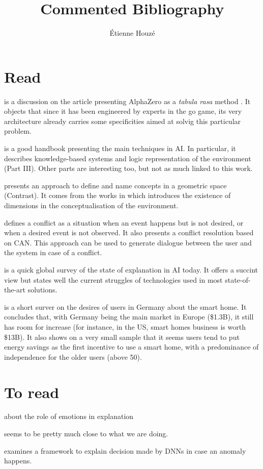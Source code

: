 \documentclass{article}
\title{Commented Bibliography}
\author{\'Etienne Houzé}
\date{}
\begin{document}
\maketitle
    \section{Read}

    \cite{marcus2018innateness} is a discussion on the article presenting AlphaZero as a \emph{tabula rasa} method \cite{silver2017mastering}. It objects that since it has been engineered by experts in the go game, its very architecture already carries some specificities aimed at solvig this particular problem.

    \cite{russell2016artificial} is a good handbook presenting the main techniques in AI. In particular, it describes knowledge-based systems and logic representation of the environment (Part III). Other parts are interesting too, but not as much linked to this work.

    \cite{dessalles2015conceptual}  presents an approach to define and name concepts in a geometric space (Contrast). It comes from the works in \cite{gardenfors2004conceptual} which introduces the existence of dimensions in the conceptualisation of the environment.

    \cite{dessalles2008computational} defines a conflict as a situation when an event happens but is not desired, or when a desired event is not observed. It also presents a conflict resolution based on CAN. This approach can be used to generate dialogue between the user and the system in case of a conflict.

    \cite{dovsilovic2018explainable} is a quick global survey of the state of explanation in AI today. It offers a succint view but states well the current struggles of technologies used in most state-of-the-art solutions.

    \cite{zimmermann2017user} is a short surver on the desires of users in Germany about the smart home. It concludes that, with Germany being the main market in Europe (\$1.3B), it still has room for increase (for instance, in the US, smart homes business is worth \$13B). It also shows on a very small sample that it seems users tend to put energy savings as the first incentive to use a smart home, with a predominance of independence for the older users (above 50).

    \section{To read}

    \cite{kaptein2017emotion} about the role of emotions in explanation

    \cite{mohamed2017conflict} seems to be pretty much close to what we are doing.

    \cite{amarasinghe2018toward} examines a framework to explain decision made by DNNs in case an anomaly happens.
\newpage


\end{document}
